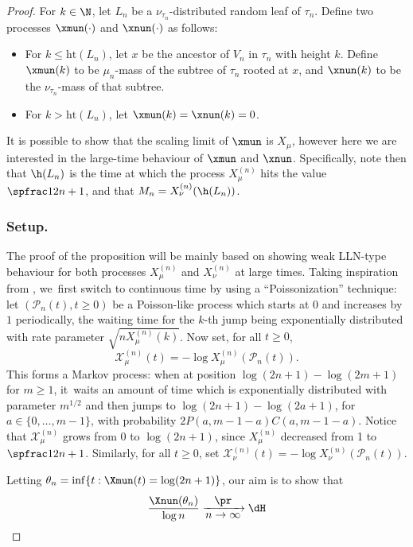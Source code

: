 \begin{proof} For $k\in\N$, let $L_n$ be a $\nu_{\tau_n}$-distributed random leaf of $\tau_n$. Define two processes $\xmun(\cdot)$ and $\xnun(\cdot)$ as follows:
\begin{itemize}
\item For $k \leq \mathrm{ht}(L_n)$, let $x$ be the ancestor of $V_n$ in $\tau_n$ with height $k$. Define $\xmun(k)$ to be $\mu_n$-mass of the subtree of $\tau_n$ rooted at $x$, and $\xnun(k)$ to be the $\nu_{\tau_n}$-mass of that subtree.
\item For $ k> \mathrm{ht}(L_n)$, let $\xmun(k)=\xnun(k)=0$.
\end{itemize}
It is possible to show that the scaling limit of $\xmun$ is $X_\mu$, however here we are interested in the large-time behaviour of $\xmun$ and $\xnun$. Specifically, note then that $\h(L_n)$ is the time at which the process $X^{(n)}_{\mu}$ hits the value $\spfrac1{2n+1}$, and that $M_n=X^{(n)}_{\nu}(\h(L_n))$.

\subsubsection*{Setup.}
The proof of the proposition will be mainly based on showing weak LLN-type behaviour for both processes $X^{(n)}_{\mu}$ and $X^{(n)}_{\nu}$ at large times. Taking inspiration from \cite{BK14}, we~first switch to continuous time by using a ``Poissonization'' technique: let $(\mathcal{P}_n(t),t\geq 0)$ be a Poisson-like process which starts at $0$ and increases by $1$ periodically, the waiting time for the $k$-th jump being exponentially distributed with rate parameter $\sqrt{nX^{(n)}_{\mu}(k)}$. Now set, for all $t\geq0$,\vspace*{-3pt}
\[
\mathcal{X}^{(n)}_{\mu}(t)=-\log X^{(n)}_{\mu}(\mathcal{P}_n(t)).
\]
This forms a Markov process: when at position $\log (2n+1) -\log (2m+1)$ for $m\geq 1$, it~waits an amount of time which is exponentially distributed with parameter $m^{1/2}$ and then jumps to $\log (2n+1) -\log (2a+1)$, for $a\in\{0,\ldots,m-1\}$, with probability $2P(a,m-1-a)C(a,m-1-a)$. Notice that $\mathcal{X}^{(n)}_{\mu}$ grows from $0$ to $\log(2n+1)$, since $X^{(n)}_{\mu}$ decreased from 1 to $\spfrac1{2n+1}$. Similarly, for all $t\geq0$, set $\mathcal{X}^{(n)}_{\nu}(t)=-\log X^{(n)}_{\nu}(\mathcal{P}_n(t))$.

Letting $\theta_n=\inf\{t: \Xmun(t) = \log (2n+1)\}$, our aim is to show that\vspace*{-3pt}
\begin{equation}\label{eq:loglimittimeprob0}
\frac{ \Xnun(\theta_n)}{\log n} \xrightarrow[\textstyle n\to\infty]{\textstyle\pr} \dH
\end{equation}


\end{proof}

